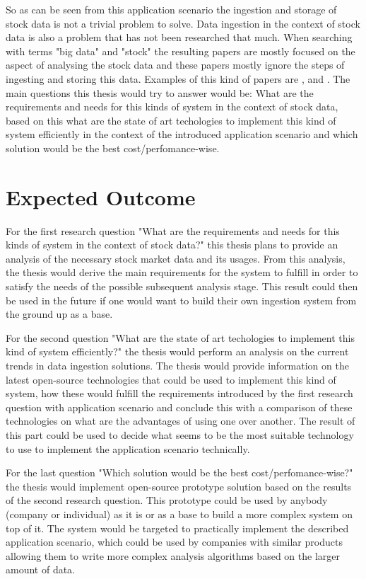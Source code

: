 \documentclass[article,11pt]{article}
\begin{document}
So as can be seen from this application scenario the ingestion and storage of stock data is not a trivial problem to solve.
Data ingestion in the context of stock data is also a problem that has not been researched that much.
When searching with terms "big data" and "stock" the resulting papers are mostly focused on the aspect of analysing the stock data and these papers mostly ignore the steps of ingesting and storing this data.
Examples of this kind of papers are \cite{wu}, \cite{aghakhani} and \cite{kao}.
The main questions this thesis would try to answer would be: What are the requirements and needs for this kinds of system in the context of stock data, based on this what are the state of art techologies to implement this kind of system efficiently in the context of the introduced application scenario and which solution would be the best cost/perfomance-wise.

\section{Expected Outcome}

For the first research question "What are the requirements and needs for this kinds of system in the context of stock data?" this thesis plans to provide an analysis of the necessary stock market data and its usages.
From this analysis, the thesis would derive the main requirements for the system to fulfill in order to satisfy the needs of the possible subsequent analysis stage.
This result could then be used in the future if one would want to build their own ingestion system from the ground up as a base.

For the second question "What are the state of art techologies to implement this kind of system efficiently?" the thesis would perform an analysis on the current trends in data ingestion solutions.
The thesis would provide information on the latest open-source technologies that could be used to implement this kind of system, how these would fulfill the requirements introduced by the first research question with application scenario and conclude this with a comparison of these technologies on what are the advantages of using one over another.
The result of this part could be used to decide what seems to be the most suitable technology to use to implement the application scenario technically. 

For the last question "Which solution would be the best cost/perfomance-wise?" the thesis would implement open-source prototype solution based on the results of the second research question.
This prototype could be used by anybody (company or individual) as it is or as a base to build a more complex system on top of it.
The system would be targeted to practically implement the described application scenario, which could be used by companies with similar products allowing them to write more complex analysis algorithms based on the larger amount of data.
\end{document}
